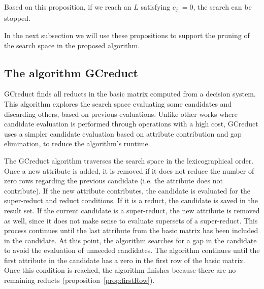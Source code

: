\documentclass[number,preprint,review,12pt]{elsarticle}
\newtheorem{corollary}{Corollary}
\begin{document}
	Based on this proposition, if we reach an $L$ satisfying $c_{j_0}=0$, the search can be stopped. 

%	
	
	In the next subsection we will use these propositions to support the pruning of the search space in the proposed algorithm.

\subsection{The algorithm GCreduct}\label{description}
	GCreduct finds all reducts in the basic matrix computed from a decision system. This algorithm explores the search space evaluating some candidates and discarding others, based on previous evaluations. Unlike other works \citep{WangP07,Lias13} where candidate evaluation is performed through operations with a high cost, GCreduct uses a simpler candidate evaluation based on attribute contribution and gap elimination, to reduce the algorithm's runtime. 
	
	\label{abstarct}
	The GCreduct algorithm traverses the search space in the lexicographical order. Once a new attribute is added, it is removed if it does not reduce the number of zero rows regarding the previous candidate (i.e. the attribute does not contribute). If the new attribute contributes, the candidate is evaluated for the super-reduct and reduct conditions. If it is a reduct, the candidate is saved in the result set. If the current candidate is a super-reduct, the new attribute is removed as well, since it does not make sense to evaluate supersets of a super-reduct. This process continues until the last attribute from the basic matrix has been included in the candidate. At this point, the algorithm searches for a gap in the candidate to avoid the evaluation of unneeded candidates. The algorithm continues until the first attribute in the candidate has a zero in the first row of the basic matrix. Once this condition is reached, the algorithm finishes because there are no remaining reducts (proposition~\ref{prop:firstRow}).
	
\end{document}
